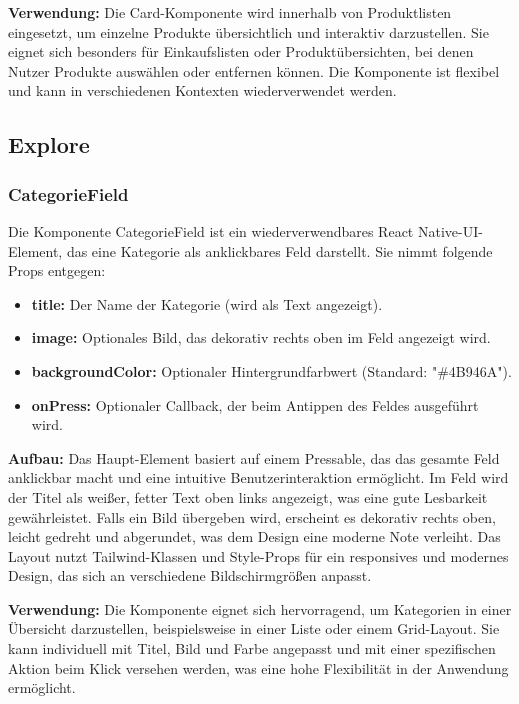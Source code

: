 \noindent\textbf{Verwendung:}
Die Card-Komponente wird innerhalb von Produktlisten eingesetzt, um einzelne Produkte übersichtlich und interaktiv darzustellen. Sie eignet sich besonders für Einkaufslisten oder Produktübersichten, bei denen Nutzer Produkte auswählen oder entfernen können. Die Komponente ist flexibel und kann in verschiedenen Kontexten wiederverwendet werden.

\subsection{Explore}

\subsubsection{CategorieField}
Die Komponente CategorieField ist ein wiederverwendbares React Native-UI-Element, das eine Kategorie als anklickbares Feld darstellt. Sie nimmt folgende Props entgegen:
\begin{itemize}
    \item \textbf{title:} Der Name der Kategorie (wird als Text angezeigt).
    \item \textbf{image:} Optionales Bild, das dekorativ rechts oben im Feld angezeigt wird.
    \item \textbf{backgroundColor:} Optionaler Hintergrundfarbwert (Standard: "\#4B946A").
    \item \textbf{onPress:} Optionaler Callback, der beim Antippen des Feldes ausgeführt wird.
\end{itemize}

\noindent\textbf{Aufbau:}
Das Haupt-Element basiert auf einem Pressable, das das gesamte Feld anklickbar macht und eine intuitive Benutzerinteraktion ermöglicht. Im Feld wird der Titel als weißer, fetter Text oben links angezeigt, was eine gute Lesbarkeit gewährleistet. Falls ein Bild übergeben wird, erscheint es dekorativ rechts oben, leicht gedreht und abgerundet, was dem Design eine moderne Note verleiht. Das Layout nutzt Tailwind-Klassen und Style-Props für ein responsives und modernes Design, das sich an verschiedene Bildschirmgrößen anpasst.

\noindent\textbf{Verwendung:} Die Komponente eignet sich hervorragend, um Kategorien in einer Übersicht darzustellen, beispielsweise in einer Liste oder einem Grid-Layout. Sie kann individuell mit Titel, Bild und Farbe angepasst und mit einer spezifischen Aktion beim Klick versehen werden, was eine hohe Flexibilität in der Anwendung ermöglicht.

